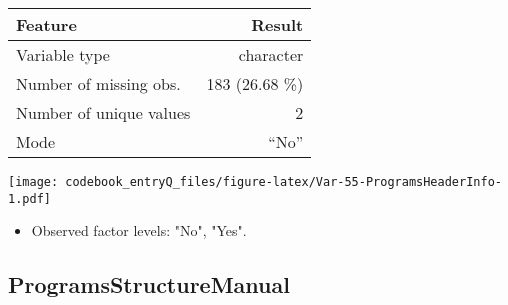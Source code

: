 \documentclass[]{article}
\providecommand{\tightlist}{%
  \setlength{\itemsep}{0pt}\setlength{\parskip}{0pt}}
\newcommand{\fullline}{\noindent\makebox[\linewidth]{\rule{\textwidth}{0.4pt}}}
\newcommand{\bminione}{\begin{minipage}{0.75 \textwidth}}
\newcommand{\bminitwo}{\begin{minipage}{0.25 \textwidth}}
\newcommand{\emini}{\end{minipage}}
\begin{document}
\bminione

\begin{longtable}[]{@{}lr@{}}
\toprule
\begin{minipage}[b]{0.34\columnwidth}\raggedright\strut
Feature\strut
\end{minipage} & \begin{minipage}[b]{0.20\columnwidth}\raggedleft\strut
Result\strut
\end{minipage}\tabularnewline
\midrule
\endhead
\begin{minipage}[t]{0.34\columnwidth}\raggedright\strut
Variable type\strut
\end{minipage} & \begin{minipage}[t]{0.20\columnwidth}\raggedleft\strut
character\strut
\end{minipage}\tabularnewline
\begin{minipage}[t]{0.34\columnwidth}\raggedright\strut
Number of missing obs.\strut
\end{minipage} & \begin{minipage}[t]{0.20\columnwidth}\raggedleft\strut
183 (26.68 \%)\strut
\end{minipage}\tabularnewline
\begin{minipage}[t]{0.34\columnwidth}\raggedright\strut
Number of unique values\strut
\end{minipage} & \begin{minipage}[t]{0.20\columnwidth}\raggedleft\strut
2\strut
\end{minipage}\tabularnewline
\begin{minipage}[t]{0.34\columnwidth}\raggedright\strut
Mode\strut
\end{minipage} & \begin{minipage}[t]{0.20\columnwidth}\raggedleft\strut
``No''\strut
\end{minipage}\tabularnewline
\bottomrule
\end{longtable}

\emini
\bminitwo
\texttt{[image: codebook\_entryQ\_files/figure-latex/Var-55-ProgramsHeaderInfo-1.pdf]}
\emini

\begin{itemize}
\tightlist
\item
  Observed factor levels: "No", "Yes".
\end{itemize}

\fullline

\hypertarget{programsstructuremanual}{\subsection{ProgramsStructureManual}\label{programsstructuremanual}}
\end{document}
